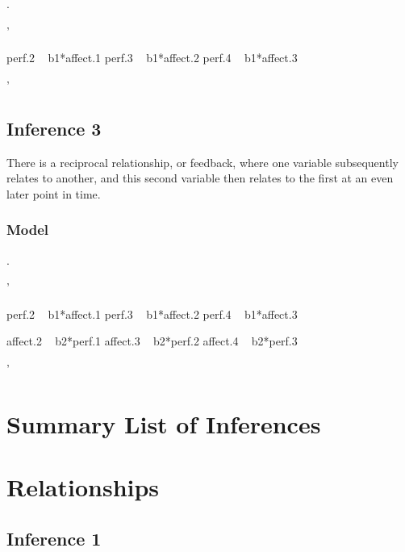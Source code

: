\documentclass[english,,man]{apa6}
\newenvironment{Shaded}{\begin{snugshade}}{\end{snugshade}}
\newcommand{\StringTok}[1]{\textcolor[rgb]{0.31,0.60,0.02}{#1}}
\theoremstyle{definition}
\theoremstyle{definition}
\theoremstyle{definition}
\theoremstyle{remark}
\begin{document}
.

\begin{Shaded}
\begin{Highlighting}[]
\StringTok{'}

\StringTok{perf.2 ~ b1*affect.1}
\StringTok{perf.3 ~ b1*affect.2}
\StringTok{perf.4 ~ b1*affect.3}

\StringTok{'}
\end{Highlighting}
\end{Shaded}

\hypertarget{inference-3-1}{%
\subsection{Inference 3}\label{inference-3-1}}

There is a reciprocal relationship, or feedback, where one variable
subsequently relates to another, and this second variable then relates
to the first at an even later point in time.

\hypertarget{model-11}{%
\subsubsection{Model}\label{model-11}}

.

\begin{Shaded}
\begin{Highlighting}[]
\StringTok{'}

\StringTok{perf.2 ~ b1*affect.1}
\StringTok{perf.3 ~ b1*affect.2}
\StringTok{perf.4 ~ b1*affect.3}

\StringTok{affect.2 ~ b2*perf.1}
\StringTok{affect.3 ~ b2*perf.2}
\StringTok{affect.4 ~ b2*perf.3}

\StringTok{'}
\end{Highlighting}
\end{Shaded}

\hypertarget{summary-list-of-inferences}{%
\section{Summary List of Inferences}\label{summary-list-of-inferences}}

\hypertarget{relationships-1}{%
\section{Relationships}\label{relationships-1}}

\hypertarget{inference-1-5}{%
\subsection{Inference 1}\label{inference-1-5}}
\end{document}
